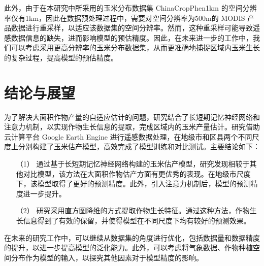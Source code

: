 \par 此外，由于在本研究中所采用的玉米分布数据集 ChinaCropPhen1km 的空间分辨率仅有1km，因此在数据预处理过程中，需要对空间分辨率为500m的 MODIS 产品数据进行重采样，以适应该数据集的空间分辨率。然而，这种重采样可能导致遥感数据信息的缺失，进而影响模型的预估精度。因此，在未来进一步的工作中，我们可以考虑采用更高分辨率的玉米分布数据集，从而更准确地捕捉区域内玉米生长的复杂过程，提高模型的预估精度。

\section{结论与展望}
\par 为了解决大面积作物产量的自适应估计的问题，研究结合了长短期记忆神经网络和注意力机制，以实现作物生长信息的提取，完成区域内的玉米产量估计。研究借助云计算平台 Google Earth Engine 进行遥感数据处理，在地级市和区县两个不同尺度上分别构建了玉米估产模型，高效完成了模型训练和对比测试。主要结论如下：

\begin{itemize}
  \item [（1）] 通过基于长短期记忆神经网络构建的玉米估产模型，研究发现相较于其他对比模型，该方法在大面积作物估产方面有更优秀的表现。在地级市尺度下，该模型取得了更好的预测精度。此外，引入注意力机制后，模型的预测精度进一步提升。
  \item [（2）] 研究采用直方图降维的方式提取作物生长特征。通过这种方法，作物生长信息得到了有效的保留，并使得模型在不同尺度下均有较好的预测效果。
\end{itemize}

\par 在未来的研究工作中，可以继续从数据集的角度进行优化，包括数据量和数据精度的提升，以进一步提高模型的泛化能力。此外，可以考虑将气象数据、作物种植空间分布作为模型的输入，以探究其他因素对于模型精度的影响。